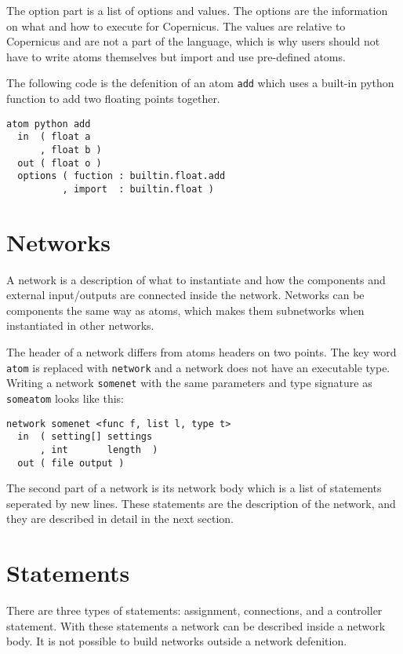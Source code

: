 The option part is a list of options and values. The options are the
information on what and how to execute for Copernicus. The values are
relative to Copernicus and are not a part of the language, which is
why users should not have to write atoms themselves but import and use
pre-defined atoms.

The following code is the defenition of an atom \verb#add# which uses
a built-in python function to add two floating points together.

\begin{verbatim}
atom python add
  in  ( float a
      , float b )
  out ( float o )
  options ( fuction : builtin.float.add
          , import  : builtin.float )
\end{verbatim}

\section{Networks}\label{sec:net}

A network is a description of what to instantiate and how the
components and external input/outputs are connected inside the
network. Networks can be components the same way as atoms, which makes
them subnetworks when instantiated in other networks.

The header of a network differs from atoms headers on two points. The
key word \verb#atom# is replaced with \verb#network# and a network
does not have an executable type. Writing a network \verb#somenet#
with the same parameters and type signature as \verb#someatom# looks
like this:

\begin{verbatim}
network somenet <func f, list l, type t>
  in  ( setting[] settings
      , int       length  )
  out ( file output )
\end{verbatim}

The second part of a network is its network body which is a list of
statements seperated by new lines. These statements are the
description of the network, and they are described in detail in the
next section.

\section{Statements} \label{sec:stmt}
There are three types of statements: assignment, connections, and a
controller statement. With these statements a network can be described
inside a network body. It is not possible to build networks outside a
network defenition.

